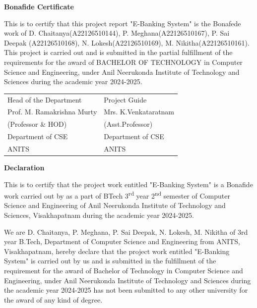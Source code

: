 \documentclass[12pt,a4paper]{report}
\begin{document}
\thispagestyle{empty}
\begin{center}
    \Large\textbf{Bonafide Certificate}
\end{center}
\vspace{1cm}

This is to certify that this project report "E-Banking System" is the Bonafede
work of D. Chaitanya(A22126510144), P. Meghana(A22126510167), P. Sai Deepak
(A22126510168), N. Lokesh(A22126510169), M. Nikitha(A22126510161). This project
is carried out and is submitted in the partial fulfillment of the requirements
for the award of BACHELOR OF TECHNOLOGY in Computer Science and Engineering,
under Anil Neerukonda Institute of Technology and Sciences during the academic
year 2024-2025.

\vspace{2cm}
\begin{tabular}{ll}
Head of the Department & Project Guide \\
Prof. M. Ramakrishna Murty & Mrs. K.Venkataratnam \\
(Professor \& HOD) & (Asst.Professor) \\
Department of CSE & Department of CSE \\
ANITS & ANITS
\end{tabular}
\newpage

\thispagestyle{empty}
\begin{center}
    \Large\textbf{Declaration}
\end{center}
\vspace{1cm}

This is to certify that the project work entitled "E-Banking System" is a
Bonafide work carried out by as a part of BTech 3\textsuperscript{rd} year
2\textsuperscript{nd} semester of Computer Science and Engineering of Anil
Neerukonda Institute of Technology and Sciences, Visakhapatnam during the
academic year 2024-2025.

We are D. Chaitanya, P. Meghana, P. Sai Deepak, N. Lokesh, M. Nikitha of 3rd
year B.Tech, Department of Computer Science and Engineering from ANITS,
Visakhapatnam, hereby declare that the project work entitled "E-Banking System"
is carried out by us and is submitted in the fulfillment of the requirement for
the award of Bachelor of Technology in Computer Science and Engineering, under
Anil Neerukonda Institute of Technology and Sciences during the academic year
2024-2025 has not been submitted to any other university for the award of any
kind of degree.
\end{document}
